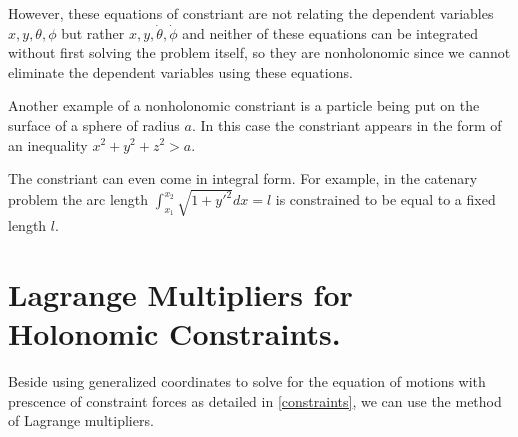 \documentclass[a4paper,12pt]{report}
\begin{document}
However, these equations of constriant are not relating the dependent variables \(x,y,\theta ,\phi \) but rather \(x,y,\dot{\theta },\dot{\phi }  \) and neither of these equations can be integrated without first solving the problem itself, so they are nonholonomic since we cannot eliminate the dependent variables using these equations.

Another example of a nonholonomic constriant is a particle being put on the surface of a sphere of radius \(a\). In this case the constriant appears in the form of an inequality \(x^2+y^2+z^2  > a\). 

The constriant can even come in integral form. For example, in the catenary problem the arc length \(\int_{x_1 }^{x_2 } \sqrt{1+y'^2}dx = l  \) is constrained to be equal to a fixed length \(l\). 


\section{Lagrange Multipliers for Holonomic Constraints.}

Beside using generalized coordinates to solve for the equation of motions with prescence of constraint forces as detailed in \cref{constraints}, we can use the method of Lagrange multipliers.
\end{document}

